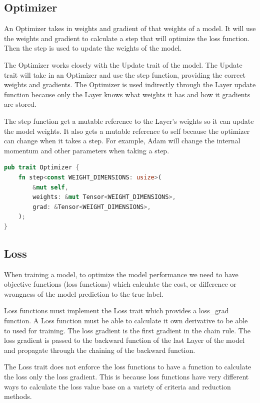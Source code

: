 \documentclass[conference]{IEEEtran}
\begin{document}
\subsection{Optimizer}
An Optimizer takes in weights and gradient of that weights of a model. It will use the weights and gradient to calculate a step that will optimize the loss function.
Then the step is used to update the weights of the model.

The Optimizer works closely with the Update trait of the model. The Update trait will take in an Optimizer and use the step function, providing the correct weights and gradients. The Optimizer is used indirectly through the Layer update function because only the Layer knows what weights it has and how it gradients are stored.

The step function get a mutable reference to the Layer's weights so it can update the model weights. It also gets a mutable reference to self because the optimizer can change when it takes a step. For example, Adam will change the internal momentum and other parameters when taking a step.

\begin{lstlisting}[language=Rust, caption={Optimizer Trait}]
pub trait Optimizer {
    fn step<const WEIGHT_DIMENSIONS: usize>(
        &mut self,
        weights: &mut Tensor<WEIGHT_DIMENSIONS>,
        grad: &Tensor<WEIGHT_DIMENSIONS>,
    );
}
\end{lstlisting}


\subsection{Loss}
When training a model, to optimize the model performance we need to have objective functions (loss functions) which calculate the cost, or difference or wrongness of the model prediction to the true label.

Loss functions must implement the Loss trait which provides a loss\_grad function. A Loss function must be able to calculate it own derivative to be able to used for training.
The loss gradient is the first gradient in the chain rule. The loss gradient is passed to the backward function of the last Layer of the model and propagate through the chaining of the backward function.

The Loss trait does not enforce the loss functions to have a function to calculate the loss only the loss gradient. This is because loss functions have very different ways to calculate the loss value base on a variety of criteria and reduction methods.
\end{document}
